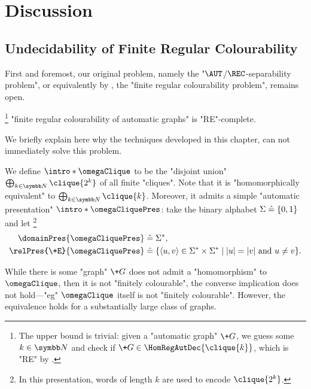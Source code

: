 \section{Discussion}
\AP\label{sec:dichotomy-discussion}

\subsection{Undecidability of Finite Regular Colourability}
\AP\label{sec:undecidability-finite-colourability}

First and foremost, our original problem, namely the "$\AUT$/$\REC$-separability problem",
or equivalently by , the "finite regular colourability problem", remains open. 

\begin{conjecture}%
	\!\footnote{The upper bound is trivial: given a "automatic graph" $\+G$,
	we guess some $k\in \N$ and check if $\+G \in \HomRegAutDec{\clique{k}}$, which is "RE"
	by .}
	\AP\label{conj:finite-regular-colourability-undecidable}
	"finite regular colourability of automatic graphs" is "RE"-complete.
\end{conjecture}

We briefly explain here why the techniques developed in this chapter,
can not immediately solve this problem. 

We define \AP$\intro*\omegaClique$ to be the "disjoint union" $\bigoplus_{k\in\N} \clique{2^k}$ of all finite "cliques". Note that it is "homomorphically equivalent" to $\bigoplus_{k\in\N} \clique{k}$.
Moreover, it admits a simple "automatic presentation" \AP$\intro*\omegaCliquePres$: take the binary alphabet $\Sigma \mathrel{\hat{=}} \{0,1\}$ and let%
\footnote{In this presentation, words of length $k$ are used to encode $\clique{2^k}$.}
\begin{align*}
	\domainPres{\omegaCliquePres} & \defeq \Sigma^*, \\ 
	\relPres{\+E}{\omegaCliquePres} & \defeq \{\tup{u,v} \in \Sigma^* \times \Sigma^* \mid |u| = |v| \text{ and }
	u \neq v\}.
\end{align*}

While there is some "graph" $\+G$ does not admit a "homomorphism" to $\omegaClique$, then it is not "finitely colourable", the converse implication does not hold---"eg" $\omegaClique$ itself is not "finitely colourable". However, the equivalence holds for a substantially large class of graphs.

